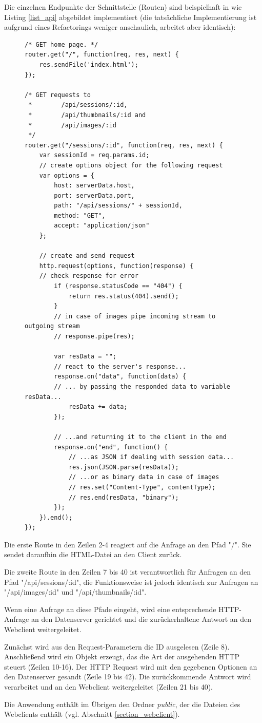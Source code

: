 Die einzelnen Endpunkte der Schnittstelle (Routen) sind beispielhaft in wie Listing \ref{list_api} abgebildet implementiert (die tatsächliche Implementierung ist aufgrund eines Refactorings weniger anschaulich, arbeitet aber identisch):

\begin{figure}
\begin{lstlisting}[caption={Auszug aus den Dateien routes/index.js und routes/apiRoutes.js}, label=list_api]
/* GET home page. */
router.get("/", function(req, res, next) {
    res.sendFile('index.html');
});

/* GET requests to 
 *        /api/sessions/:id,
 *        /api/thumbnails/:id and 
 *        /api/images/:id 
 */
router.get("/sessions/:id", function(req, res, next) {
    var sessionId = req.params.id;
    // create options object for the following request
	var options = {
		host: serverData.host,
		port: serverData.port,
		path: "/api/sessions/" + sessionId,
		method: "GET",
		accept: "application/json"
	};

	// create and send request
	http.request(options, function(response) {
	// check response for error
	    if (response.statusCode == "404") {
	        return res.status(404).send();
		}
		// in case of images pipe incoming stream to outgoing stream
		// response.pipe(res);
		
		var resData = "";
		// react to the server's response...
		response.on("data", function(data) {
		// ... by passing the responded data to variable resData...
		    resData += data;
		});
		
		// ...and returning it to the client in the end
		response.on("end", function() {
		    // ...as JSON if dealing with session data...
		    res.json(JSON.parse(resData));
		    // ...or as binary data in case of images
		    // res.set("Content-Type", contentType);
		    // res.end(resData, "binary");
		});
	}).end();
});
\end{lstlisting}
\end{figure}\clearpage

Die erste Route in den Zeilen 2-4 reagiert auf die Anfrage an den Pfad "/".
Sie sendet daraufhin die HTML-Datei an den Client zurück.

Die zweite Route in den Zeilen 7 bis 40 ist verantwortlich für Anfragen an den Pfad 
"/api/sessions/:id", die Funktionsweise ist jedoch identisch zur Anfragen 
an "/api/images/:id"{} und "/api/thumbnails/:id".

Wenn eine Anfrage an diese Pfade eingeht, wird eine entsprechende HTTP-Anfrage 
an den Datenserver gerichtet und die zurückerhaltene Antwort an den Webclient 
weitergeleitet.

Zunächst wird aus den Request-Parametern die ID ausgelesen (Zeile 8). Anschließend 
wird ein Objekt erzeugt, das die Art der ausgehenden HTTP steuert (Zeilen 10-16).
Der HTTP Request wird mit den gegebenen Optionen an den Datenserver gesandt (Zeile 19 bis 42).
Die zurückkommende Antwort wird verarbeitet und an den Webclient weitergeleitet (Zeilen 21 bis 40).

Die Anwendung enthält im Übrigen den Ordner \textit{public}, der die Dateien des Webclients 
enthält (vgl. Abschnitt \ref{section_webclient}).


